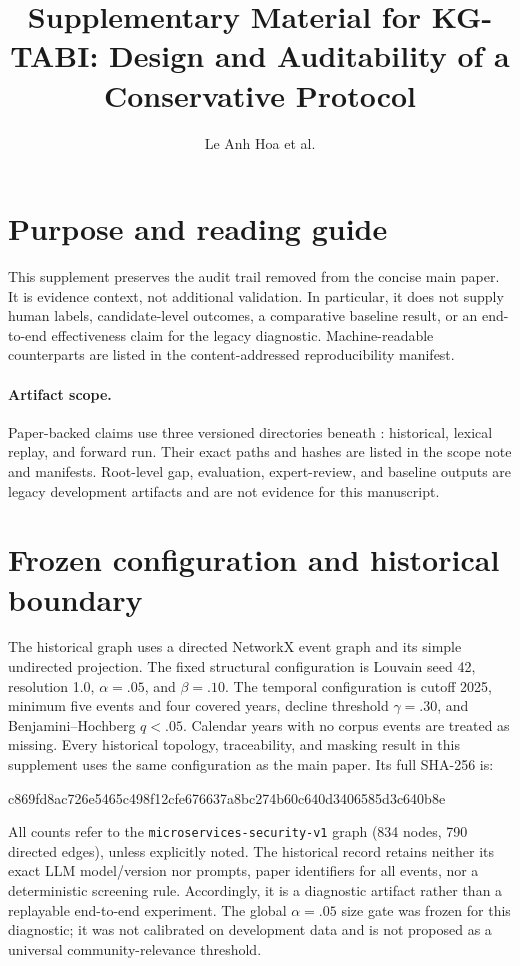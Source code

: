 \documentclass[runningheads]{llncs}
\begin{document}
\title{Supplementary Material for KG-TABI: Design and Auditability of a Conservative Protocol}
\author{Le Anh Hoa et al.}
\maketitle

\section{Purpose and reading guide}
This supplement preserves the audit trail removed from the concise main paper. It is evidence context, not additional validation. In particular, it does not supply human labels, candidate-level outcomes, a comparative baseline result, or an end-to-end effectiveness claim for the legacy diagnostic. Machine-readable counterparts are listed in the content-addressed reproducibility manifest.

\paragraph{Artifact scope.} Paper-backed claims use three versioned directories beneath : historical, lexical replay, and forward run. Their exact paths and hashes are listed in the scope note and manifests. Root-level gap, evaluation, expert-review, and baseline outputs are legacy development artifacts and are not evidence for this manuscript.

\section{Frozen configuration and historical boundary}
The historical graph uses a directed NetworkX event graph and its simple undirected projection. The fixed structural configuration is Louvain seed 42, resolution 1.0, $\alpha=.05$, and $\beta=.10$. The temporal configuration is cutoff 2025, minimum five events and four covered years, decline threshold $\gamma=.30$, and Benjamini--Hochberg $q<.05$. Calendar years with no corpus events are treated as missing. Every historical topology, traceability, and masking result in this supplement uses the same configuration as the main paper. Its full SHA-256 is:
\begin{center}\scriptsize\ttfamily
c869fd8ac726e5465c498f12cfe676637a8bc274b60c640d3406585d3c640b8e
\end{center}
All counts refer to the \texttt{microservices-security-v1} graph (834 nodes, 790 directed edges), unless explicitly noted. The historical record retains neither its exact LLM model/version nor prompts, paper identifiers for all events, nor a deterministic screening rule. Accordingly, it is a diagnostic artifact rather than a replayable end-to-end experiment. The global $\alpha=.05$ size gate was frozen for this diagnostic; it was not calibrated on development data and is not proposed as a universal community-relevance threshold.
\end{document}
